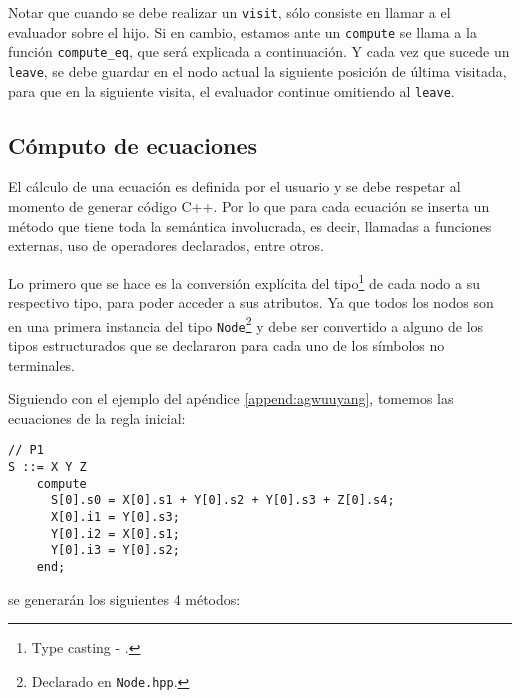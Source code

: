 Notar que cuando se debe realizar un \texttt{visit}, sólo consiste en llamar a el evaluador sobre el hijo. Si en cambio, estamos ante un \texttt{compute} se llama a la función \texttt{compute\_eq}, que será explicada a continuación. Y cada vez que sucede un \texttt{leave}, se debe guardar en el nodo actual la siguiente posición de última visitada, para que en la siguiente visita, el evaluador continue omitiendo al \texttt{leave}.

\subsection{Cómputo de ecuaciones}

El cálculo de una ecuación es definida por el usuario y se debe respetar al momento de generar código C++. Por lo que para cada ecuación se inserta un método que tiene toda la semántica involucrada, es decir, llamadas a funciones externas, uso de operadores declarados, entre otros.

Lo primero que se hace es la conversión explícita del tipo\footnote{Type casting - .} de cada nodo a su respectivo tipo, para poder acceder a sus atributos. Ya que todos los nodos son en una primera instancia del tipo \texttt{Node}\footnote{Declarado en \texttt{Node.hpp}.} y debe ser convertido a alguno de los tipos estructurados que se declararon para cada uno de los símbolos no terminales.

Siguiendo con el ejemplo del apéndice \ref{append:agwuuyang}, tomemos las ecuaciones de la regla inicial:

\vspace*{0.2cm}
\begin{lstlisting}[language=specmag, basicstyle=\scriptsize, columns=fullflexible, linewidth=8cm]
// P1
S ::= X Y Z
    compute        
      S[0].s0 = X[0].s1 + Y[0].s2 + Y[0].s3 + Z[0].s4;
      X[0].i1 = Y[0].s3;
      Y[0].i2 = X[0].s1;
      Y[0].i3 = Y[0].s2;
    end;
\end{lstlisting}
\vspace*{0.2cm}

se generarán los siguientes 4 métodos:

